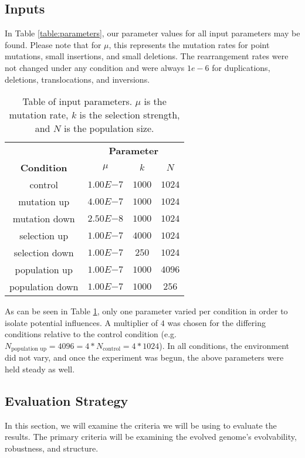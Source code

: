 \subsection{Inputs}
In Table \ref{table:parameters}, our parameter values for all input parameters may be found. Please note that for $\mu$, this represents the mutation rates for point mutations, small insertions, and small deletions. The rearrangement rates were not changed under any condition and were always $1e-6$ for duplications, deletions, translocations, and inversions. 

\begin{table}[h]
	\centering
	\begin{tabular}{|c||c|c|c|}
		\hline
		 & \multicolumn{3}{c|}{\textbf{Parameter}} \\
		\cline{2-4}
		\textbf{Condition} &$\mu$ & $k$ & $N$ \\
		\hline
		control & $1.00E{-7}$ & $1000$ & $1024$ \\
		\hline
		mutation up & $4.00E{-7}$ & $1000$ & $1024$ \\
		\hline
		mutation down & $2.50E{-8}$ & $1000$ & $1024$ \\
		\hline
		selection up & $1.00E{-7}$ & $4000$ & $1024$ \\
		\hline
		selection down & $1.00E{-7}$ & $250$ & $1024$ \\
		\hline
		population up & $1.00E{-7}$ & $1000$ & $4096$ \\
		\hline
		population down & $1.00E{-7}$ & $1000$ & $256$ \\		
		\hline
	\end{tabular}
	\caption[Table of parameters]{Table of input parameters. $\mu$ is the mutation rate, $k$ is the selection strength, and $N$ is the population size.}
	\label{table:input_parameters}
\end{table}
As can be seen in Table \ref{table:input_parameters}, only one parameter varied per condition in order to isolate potential influences. A multiplier of $4$ was chosen for the differing conditions relative to the control condition (e.g. $N_\text{population up} = 4096 = 4*N_\text{control} = 4*1024$). In all conditions, the environment did not vary, and once the experiment was begun, the above parameters were held steady as well. 


\subsection{Evaluation Strategy}
In this section, we will examine the criteria we will be using to evaluate the results. The primary criteria will be examining the evolved genome's evolvability, robustness, and structure. 


